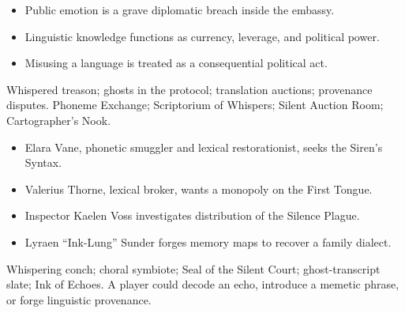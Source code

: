 \documentclass[10pt]{article}
\begin{document}
\begin{minipage}[t]{0.48\linewidth}
\begin{itemize}
\item Public emotion is a grave diplomatic breach inside the embassy.
\item Linguistic knowledge functions as currency, leverage, and political power.
\item Misusing a language is treated as a consequential political act.
\end{itemize}
Whispered treason; ghosts in the protocol; translation auctions; provenance disputes.
Phoneme Exchange; Scriptorium of Whispers; Silent Auction Room; Cartographer's Nook.
\end{minipage}\hfill
\begin{minipage}[t]{0.48\linewidth}
\begin{itemize}
\item Elara Vane, phonetic smuggler and lexical restorationist, seeks the Siren's Syntax.
\item Valerius Thorne, lexical broker, wants a monopoly on the First Tongue.
\item Inspector Kaelen Voss investigates distribution of the Silence Plague.
\item Lyraen ``Ink-Lung'' Sunder forges memory maps to recover a family dialect.
\end{itemize}
Whispering conch; choral symbiote; Seal of the Silent Court; ghost-transcript slate; Ink of Echoes. A player could decode an echo, introduce a memetic phrase, or forge linguistic provenance.
\end{minipage}
\end{document}
